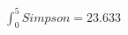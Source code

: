 \documentclass[preview]{standalone}
\begin{document}
\begin{align*}
\int_0^5 Simpson =  23.633
\end{align*}
\end{document}
